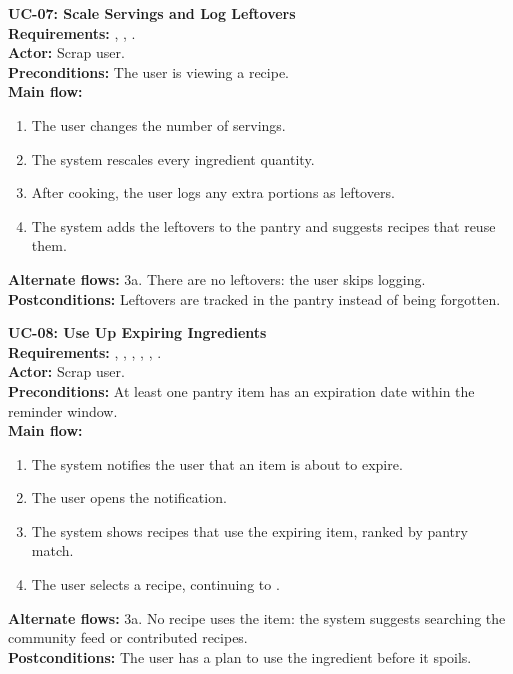 \begin{sloppypar}
\medskip\noindent\textbf{UC-07: Scale Servings and Log Leftovers}\\
\textbf{Requirements:} , , .\\
\textbf{Actor:} Scrap user.\\
\textbf{Preconditions:} The user is viewing a recipe.\\
\textbf{Main flow:}
\begin{enumerate}
\item The user changes the number of servings.
\item The system rescales every ingredient quantity.
\item After cooking, the user logs any extra portions as leftovers.
\item The system adds the leftovers to the pantry and suggests recipes that reuse them.
\end{enumerate}
\textbf{Alternate flows:} 3a. There are no leftovers: the user skips logging.\\
\textbf{Postconditions:} Leftovers are tracked in the pantry instead of being forgotten.

\medskip\noindent\textbf{UC-08: Use Up Expiring Ingredients}\\
\textbf{Requirements:} , , , , , .\\
\textbf{Actor:} Scrap user.\\
\textbf{Preconditions:} At least one pantry item has an expiration date within the reminder window.\\
\textbf{Main flow:}
\begin{enumerate}
\item The system notifies the user that an item is about to expire.
\item The user opens the notification.
\item The system shows recipes that use the expiring item, ranked by pantry match.
\item The user selects a recipe, continuing to .
\end{enumerate}
\textbf{Alternate flows:} 3a. No recipe uses the item: the system suggests searching the community feed or contributed recipes.\\
\textbf{Postconditions:} The user has a plan to use the ingredient before it spoils.


\end{sloppypar}
